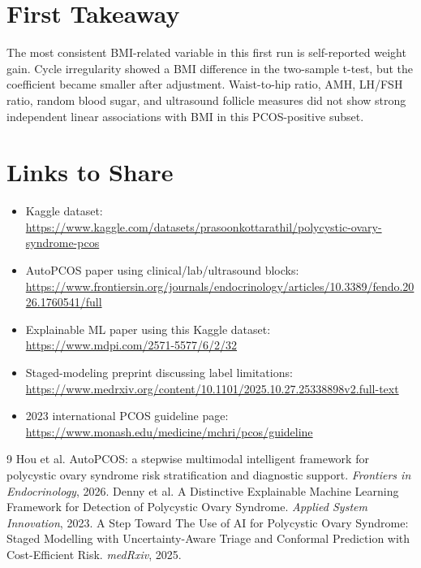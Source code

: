 \documentclass[10pt,twocolumn]{article}
\begin{document}
\section{First Takeaway}
The most consistent BMI-related variable in this first run is self-reported weight gain. Cycle irregularity showed a BMI difference in the two-sample t-test, but the coefficient became smaller after adjustment. Waist-to-hip ratio, AMH, LH/FSH ratio, random blood sugar, and ultrasound follicle measures did not show strong independent linear associations with BMI in this PCOS-positive subset.

\section{Links to Share}
\begin{itemize}
\item Kaggle dataset: \url{https://www.kaggle.com/datasets/prasoonkottarathil/polycystic-ovary-syndrome-pcos}
\item AutoPCOS paper using clinical/lab/ultrasound blocks: \url{https://www.frontiersin.org/journals/endocrinology/articles/10.3389/fendo.2026.1760541/full}
\item Explainable ML paper using this Kaggle dataset: \url{https://www.mdpi.com/2571-5577/6/2/32}
\item Staged-modeling preprint discussing label limitations: \url{https://www.medrxiv.org/content/10.1101/2025.10.27.25338898v2.full-text}
\item 2023 international PCOS guideline page: \url{https://www.monash.edu/medicine/mchri/pcos/guideline}
\end{itemize}

\begin{thebibliography}{9}
 Hou et al. AutoPCOS: a stepwise multimodal intelligent framework for polycystic ovary syndrome risk stratification and diagnostic support. \textit{Frontiers in Endocrinology}, 2026.
 Denny et al. A Distinctive Explainable Machine Learning Framework for Detection of Polycystic Ovary Syndrome. \textit{Applied System Innovation}, 2023.
 A Step Toward The Use of AI for Polycystic Ovary Syndrome: Staged Modelling with Uncertainty-Aware Triage and Conformal Prediction with Cost-Efficient Risk. \textit{medRxiv}, 2025.
\end{thebibliography}
\end{document}

